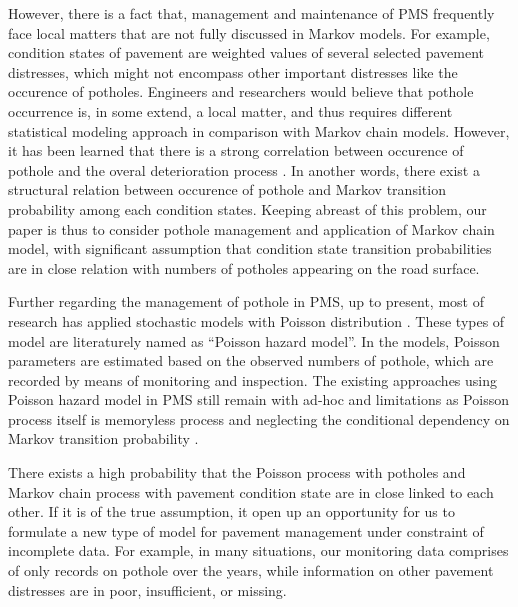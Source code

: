 \documentclass[a4paper,oneside,onecolumn,preprint,10pt,authoryear]{elsarticle}
\begin{document}
However, there is a fact that, management and maintenance of PMS frequently face local matters that are not fully discussed in Markov models. For example, condition states of pavement are weighted values of several selected pavement distresses, which might not encompass other important distresses like the occurence of potholes. Engineers and researchers would believe that pothole occurrence is, in some extend, a local matter, and thus requires different statistical modeling approach in comparison with Markov chain models. However, it has been learned that there is a strong correlation between occurence of pothole and the overal deterioration process \citep{donglin03}. In another words, there exist a structural relation between occurence of pothole and Markov transition probability among each condition states. Keeping abreast of this problem, our paper is thus to consider pothole management and application of Markov chain model, with significant assumption that condition state transition probabilities are in close relation with numbers of potholes appearing on the road surface.

Further regarding the management of pothole in PMS, up to present, most of research has applied stochastic models with Poisson distribution \citep{madanatpoisson}. These types of model are literaturely named as ``Poisson hazard model''. In the models, Poisson parameters are estimated based on the observed numbers of pothole, which are recorded by means of monitoring and inspection. The existing approaches  using Poisson hazard model in PMS still remain with ad-hoc and limitations as Poisson process itself is memoryless process and neglecting the conditional dependency on Markov transition probability \citep{namlt2009}.

There exists a high probability that the Poisson process with potholes and Markov chain process with pavement condition state are in close linked to each other. If it is of the true assumption, it open up an opportunity for us to formulate a new type of model for pavement management under constraint of incomplete data. For example, in many situations, our monitoring data comprises of only records on pothole over the years, while information on other pavement distresses are in poor, insufficient, or missing. 
\end{document}
